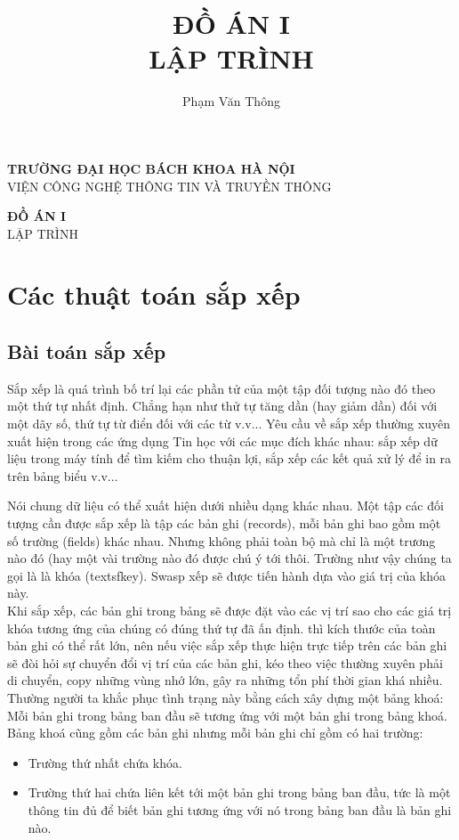 \documentclass[a4paper]{article}
\title{\textbf{\huge{ĐỒ ÁN I}}\\ \large{\textsc{LẬP TRÌNH}}}
\author{Phạm Văn Thông}
\date{}
\begin{document}
\begin{center}
\textbf{\Large{TRƯỜNG ĐẠI HỌC BÁCH KHOA HÀ NỘI}}\\
\textsc{VIỆN CÔNG NGHỆ THÔNG TIN VÀ TRUYỀN THÔNG}

\vspace{2cm}

\textbf{\Huge{ĐỒ ÁN I}} \\ \LARGE{\textsc{LẬP TRÌNH}}
\author{}
\end{center}

\newpage

\section{Các thuật toán sắp xếp}
\subsection{Bài toán sắp xếp}

Sắp xếp là quá trình bố trí lại các phần tử của một tập đối tượng nào đó theo một thứ tự nhất định. Chẳng hạn như thử tự tăng dần (hay giảm dần) đối với một dãy số, thứ tự từ điển đối với các từ v.v... Yêu cầu về sắp xếp thường xuyên xuất hiện trong các ứng dụng Tin học với các mục đích khác nhau: sắp xếp dữ liệu trong máy tính để tìm kiếm cho thuận lợi, sắp xếp các kết quả xử lý để in ra trên bảng biểu v.v...

Nói chung dữ liệu có thể xuất hiện dưới nhiều dạng khác nhau. Một tập các đối tượng cần được sắp xếp là tập các bản ghi (records), mỗi bản ghi bao gồm một số trường (fields) khác nhau. Nhưng không phải toàn bộ mà chỉ là một trương nào đó (hay một vài trường nào đó được chú ý tới thôi. Trường như vậy chúng ta gọi là là \textsf{khóa} (textsf{key}). Swasp xếp sẽ được tiến hành dựa vào giá trị của khóa này.\\

Khi sắp xếp, các bản ghi trong bảng sẽ được đặt vào các vị trí sao cho các giá trị khóa tương ứng của chúng có đúng thứ tự đã ấn định. thì kích thước của toàn bản ghi có thể rất lớn, nên
nếu việc sắp xếp thực hiện trực tiếp trên các bản ghi sẽ đòi hỏi sự chuyển đổi vị trí của các
bản ghi, kéo theo việc thường xuyên phải di chuyển, copy những vùng nhớ lớn, gây ra những
tổn phí thời gian khá nhiều. Thường người ta khắc phục tình trạng này bằng cách xây dựng
một bảng khoá: Mỗi bản ghi trong bảng ban đầu sẽ tương ứng với một bản ghi trong \textsf{bảng
khoá}. Bảng khoá cũng gồm các bản ghi nhưng mỗi bản ghi chỉ gồm có hai trường: 
\begin{itemize}
\item Trường thứ nhất chứa khóa.
\item Trường thứ hai chứa liên kết tới một bản ghi trong bảng ban đầu, tức là một thông tin đủ để biết bản ghi tương ứng với nó trong bảng ban đầu là bản ghi nào.
\end{itemize}
\end{document}
